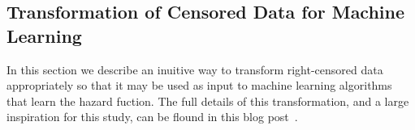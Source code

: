 \documentclass[10pt,letterpaper]{article}
\begin{document}





\subsection*{Transformation of Censored Data for Machine Learning}
\label{subsec:transformation}

In this section we describe an inuitive way to transform right-censored data appropriately so that it may be used as input to machine learning algorithms that learn the hazard fuction. The full details of this transformation, and a large inspiration for this study, can be flound in this blog post~\cite{kuhn}.
\end{document}
